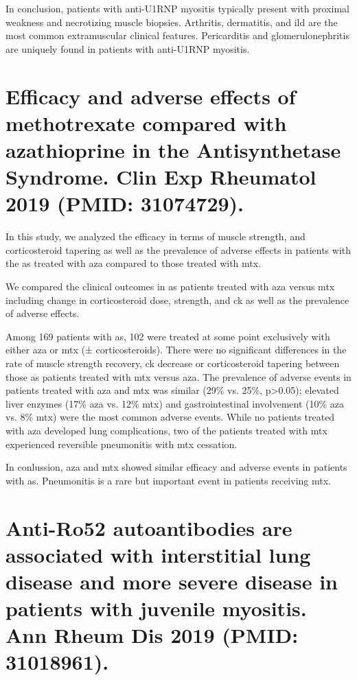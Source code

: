 In conclusion, patients with anti-U1RNP myositis typically present with proximal weakness and necrotizing muscle biopsies. Arthritis, dermatitis, and \gls{ild} are the most common extramuscular clinical features. Pericarditis and glomerulonephritis are uniquely found in patients with anti-U1RNP myositis.


{\cleardoublepage}

\section{Efficacy and adverse effects of methotrexate compared with azathioprine in the Antisynthetase Syndrome. Clin Exp Rheumatol 2019 (PMID: 31074729).}
\label{sec:mtx_aza}

In this study, we analyzed the efficacy in terms of muscle strength, and corticosteroid tapering as well as the prevalence of adverse effects in patients with the \gls{as} treated with \gls{aza} compared to those treated with \gls{mtx}.

We compared the clinical outcomes in \gls{as} patients treated with \gls{aza} versus \gls{mtx} including change in corticosteroid dose, strength, and \gls{ck} as well as the prevalence of adverse effects.

Among 169 patients with \gls{as}, 102 were treated at some point exclusively with either \gls{aza} or \gls{mtx} (± corticosteroids). There were no significant differences in the rate of muscle strength recovery, \gls{ck} decrease or corticosteroid tapering between those \gls{as} patients treated with \gls{mtx} versus \gls{aza}. The prevalence of adverse events in patients treated with \gls{aza} and \gls{mtx} was similar (29\% vs. 25\%, p>0.05); elevated liver enzymes (17\% \gls{aza} vs. 12\% \gls{mtx}) and gastrointestinal involvement (10\% \gls{aza} vs. 8\% \gls{mtx}) were the most common adverse events. While no patients treated with \gls{aza} developed lung complications, two of the patients treated with \gls{mtx} experienced reversible pneumonitis with \gls{mtx} cessation. 

In conlussion, \gls{aza} and \gls{mtx} showed similar efficacy and adverse events in patients with \gls{as}. Pneumonitis is a rare but important event in patients receiving \gls{mtx}.


{\cleardoublepage}

\section{Anti-Ro52 autoantibodies are associated with interstitial lung disease and more severe disease in patients with juvenile myositis. Ann Rheum Dis 2019 (PMID: 31018961).}
\label{sec:ro52}

